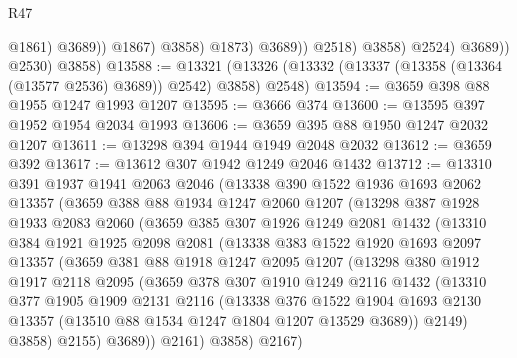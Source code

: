 \begin{lexlean}{R47}
\begin{coremodule}
                                  @1861)
                                @3689))
                            @1867)
                          @3858)
                        @1873)
                      @3689))
                  @2518)
                @3858)
              @2524)
            @3689))
        @2530)
      @3858)
@13588 := @13321 (@13326 (@13332 (@13337 (@13358 (@13364 (@13577 @2536) @3689)) @2542) @3858) @2548)
@13594 := @3659 @398 @88 @1955 @1247 @1993 @1207
@13595 := @3666 @374
@13600 := @13595 @397 @1952 @1954 @2034 @1993
@13606 := @3659 @395 @88 @1950 @1247 @2032 @1207
@13611 := @13298 @394 @1944 @1949 @2048 @2032
@13612 := @3659 @392
@13617 := @13612 @307 @1942 @1249 @2046 @1432
@13712 := @13310
    @391
    @1937
    @1941
    @2063
    @2046
    (@13338
      @390
      @1522
      @1936
      @1693
      @2062
      @13357
      (@3659
        @388
        @88
        @1934
        @1247
        @2060
        @1207
        (@13298
          @387
          @1928
          @1933
          @2083
          @2060
          (@3659
            @385
            @307
            @1926
            @1249
            @2081
            @1432
            (@13310
              @384
              @1921
              @1925
              @2098
              @2081
              (@13338
                @383
                @1522
                @1920
                @1693
                @2097
                @13357
                (@3659
                  @381
                  @88
                  @1918
                  @1247
                  @2095
                  @1207
                  (@13298
                    @380
                    @1912
                    @1917
                    @2118
                    @2095
                    (@3659
                      @378
                      @307
                      @1910
                      @1249
                      @2116
                      @1432
                      (@13310
                        @377
                        @1905
                        @1909
                        @2131
                        @2116
                        (@13338
                          @376
                          @1522
                          @1904
                          @1693
                          @2130
                          @13357
                          (@13510 @88 @1534 @1247 @1804 @1207 @13529 @3689))
                        @2149)
                      @3858)
                    @2155)
                  @3689))
              @2161)
            @3858)
          @2167)

\end{coremodule}
\end{lexlean}
